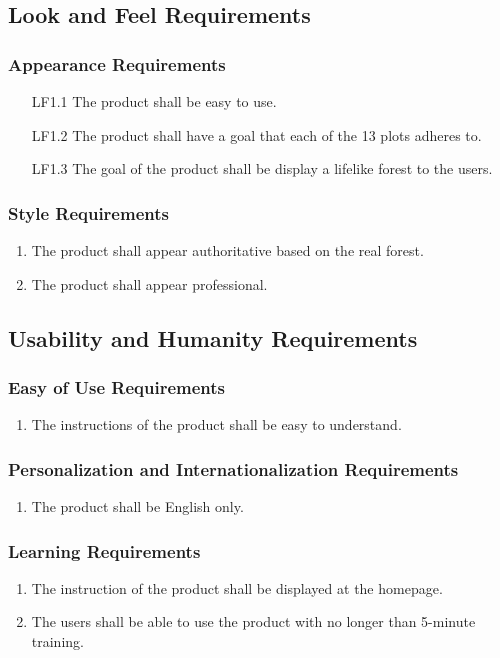 \documentclass{article}
\begin{document}
\subsection{Look and Feel Requirements}
\subsubsection{Appearance Requirements}
\begin{enumerate}
    \item[LF1.1] The product shall be easy to use.
    \item[LF1.2] The product shall have a goal that each of the 13 plots adheres to.
    \item[LF1.3] The goal of the product shall be display a lifelike forest to the users.
\end{enumerate}
\subsubsection{Style Requirements}
\begin{enumerate}[LF2.1]
    \item The product shall appear authoritative based on the real forest.
    \item The product shall appear professional.
\end{enumerate}
\subsection{Usability and Humanity Requirements}
\subsubsection{Easy of Use Requirements}
\begin{enumerate}[UH1.1]
    \item The instructions of the product shall be easy to understand.
\end{enumerate}
\subsubsection{Personalization and Internationalization Requirements}
\begin{enumerate}[UH2.1]
    \item The product shall be English only.
\end{enumerate}
\subsubsection{Learning Requirements}
\begin{enumerate}[UH3.1]
    \item The instruction of the product shall be displayed at the homepage.
    \item The users shall be able to use the product with no longer than 5-minute training. 
\end{enumerate}
\end{document}
